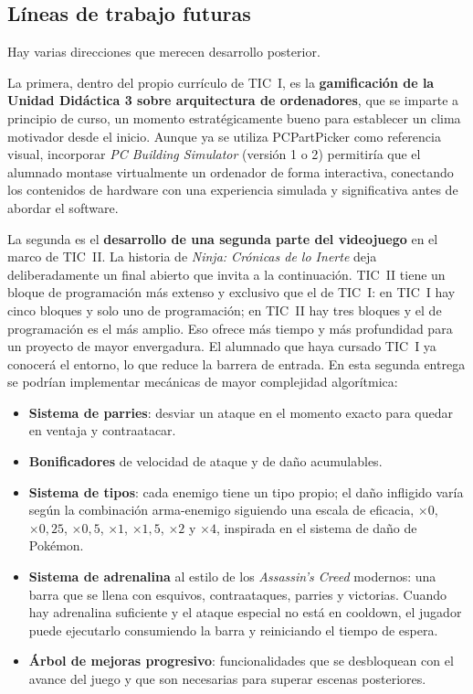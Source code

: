 \documentclass[a4paper,12pt]{article}
\begin{document}
\subsection{Líneas de trabajo futuras}

Hay varias direcciones que merecen desarrollo posterior.

La primera, dentro del propio currículo de TIC~I, es la \textbf{gamificación de la Unidad Didáctica 3 sobre arquitectura de ordenadores}, que se imparte a principio de curso, un momento estratégicamente bueno para establecer un clima motivador desde el inicio. Aunque ya se utiliza PCPartPicker\cite{pcpartpicker} como referencia visual, incorporar \textit{PC Building Simulator} (versión 1\cite{pcbs1} o 2\cite{pcbs2}) permitiría que el alumnado montase virtualmente un ordenador de forma interactiva, conectando los contenidos de hardware con una experiencia simulada y significativa antes de abordar el software.

La segunda es el \textbf{desarrollo de una segunda parte del videojuego} en el marco de TIC~II. La historia de \textit{Ninja: Crónicas de lo Inerte} deja deliberadamente un final abierto que invita a la continuación. TIC~II tiene un bloque de programación más extenso y exclusivo que el de TIC~I: en TIC~I hay cinco bloques y solo uno de programación; en TIC~II hay tres bloques y el de programación es el más amplio. Eso ofrece más tiempo y más profundidad para un proyecto de mayor envergadura. El alumnado que haya cursado TIC~I ya conocerá el entorno, lo que reduce la barrera de entrada. En esta segunda entrega se podrían implementar mecánicas de mayor complejidad algorítmica:

\begin{itemize}
  \item \textbf{Sistema de parries}: desviar un ataque en el momento exacto para quedar en ventaja y contraatacar.
  \item \textbf{Bonificadores} de velocidad de ataque y de daño acumulables.
  \item \textbf{Sistema de tipos}: cada enemigo tiene un tipo propio; el daño infligido varía según la combinación arma-enemigo siguiendo una escala de eficacia, \(\times 0\), \(\times 0{,}25\), \(\times 0{,}5\), \(\times 1\), \(\times 1{,}5\), \(\times 2\) y \(\times 4\), inspirada en el sistema de daño de Pokémon.
  \item \textbf{Sistema de adrenalina} al estilo de los \textit{Assassin's Creed} modernos: una barra que se llena con esquivos, contraataques, parries y victorias. Cuando hay adrenalina suficiente y el ataque especial no está en cooldown, el jugador puede ejecutarlo consumiendo la barra y reiniciando el tiempo de espera.
  \item \textbf{Árbol de mejoras progresivo}: funcionalidades que se desbloquean con el avance del juego y que son necesarias para superar escenas posteriores.
\end{itemize}
\end{document}
